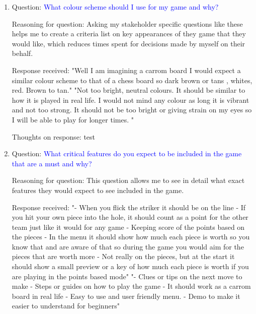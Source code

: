 \documentclass[11pt,a4paper]{report}
\begin{document}
\begin{enumerate}
    \colorbox{l-purple}{Thoughts on response:} \noindent \textcolor{d-purple}{This answer will help me to}




    \item \colorbox{l-blue}{Question:} \textcolor{blue}{What colour scheme should I use for my game and why?}

    \colorbox{l-green}{Reasoning for question:} \textcolor{dark-green}{Asking my stakeholder specific questions like these helps me to create a criteria list on key appearances of they game that they would like, which reduces times spent for decisions made by myself on their behalf.}

    \colorbox{l-red}{Response received:} \noindent \textcolor{crimson-red}{"Well I am imagining a carrom board I would expect a similar colour scheme to that of a chess board so dark brown or tans , whites, red. Brown to tan." \newline "Not too bright, neutral colours. It should be similar to how it is played in real life. I would not mind any colour as long it is vibrant and not too strong.
It should not be too bright or giving strain on my eyes so I will be able to play for longer times. "}

    \colorbox{l-purple}{Thoughts on response:} \noindent \textcolor{d-purple}{test}



    \item \colorbox{l-blue}{Question:} \textcolor{blue}{What critical features do you expect to be included in the game that are a must and why?}

    \colorbox{l-green}{Reasoning for question:} \textcolor{dark-green}{This question allows me to see in detail what exact features they would expect to see included in the game.}

    \colorbox{l-red}{Response received:} \noindent \textcolor{crimson-red}{"- When you flick the striker it should be on the line
- If you hit your own piece into the hole, it should count as a point for the other team just like it would for any game
- Keeping score of the points based on the pieces
- In the menu it should show how much each piece is worth so you know that and are aware of that so during the game you would aim for the pieces that are worth more
- Not really on the pieces, but at the start it should show a small preview or a key of how much each piece is worth if you are playing in the points based mode" \newline \newline "- Clues or tips on the next move to make
- Steps or guides on how to play the game
- It should work as a carrom board in real life
- Easy to use and user friendly menu.
- Demo to make it easier to understand for beginners"}


\end{enumerate}
\end{document}
